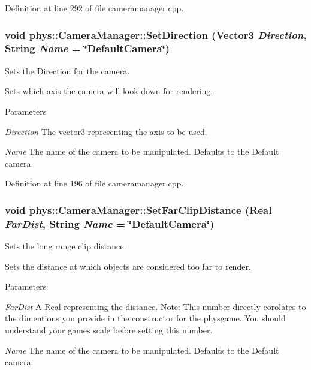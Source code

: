 Definition at line 292 of file cameramanager.cpp.

\hypertarget{classphys_1_1CameraManager_aaee96e189230c020d6f7b6fe439e0812}{
\subsubsection[{SetDirection}]{\setlength{\rightskip}{0pt plus 5cm}void phys::CameraManager::SetDirection ({\bf Vector3} {\em Direction}, \/  {\bf String} {\em Name} = {\ttfamily \char`\"{}DefaultCamera\char`\"{}})}}
\label{d9/d91/classphys_1_1CameraManager_aaee96e189230c020d6f7b6fe439e0812}


Sets the Direction for the camera. 

Sets which axis the camera will look down for rendering. 
\begin{DoxyParams}{Parameters}
\item[{\em Direction}]The vector3 representing the axis to be used. \item[{\em Name}]The name of the camera to be manipulated. Defaults to the Default camera. \end{DoxyParams}


Definition at line 196 of file cameramanager.cpp.

\hypertarget{classphys_1_1CameraManager_a809e4e31a9ad42afd620e95508ad78d7}{
\subsubsection[{SetFarClipDistance}]{\setlength{\rightskip}{0pt plus 5cm}void phys::CameraManager::SetFarClipDistance ({\bf Real} {\em FarDist}, \/  {\bf String} {\em Name} = {\ttfamily \char`\"{}DefaultCamera\char`\"{}})}}
\label{d9/d91/classphys_1_1CameraManager_a809e4e31a9ad42afd620e95508ad78d7}


Sets the long range clip distance. 

Sets the distance at which objects are considered too far to render. 
\begin{DoxyParams}{Parameters}
\item[{\em FarDist}]A Real representing the distance. Note: This number directly corolates to the dimentions you provide in the constructor for the physgame. You should understand your games scale before setting this number. \item[{\em Name}]The name of the camera to be manipulated. Defaults to the Default camera. \end{DoxyParams}


